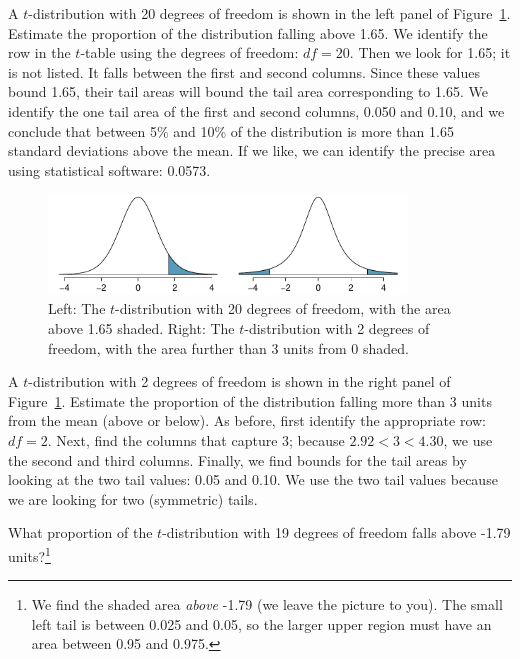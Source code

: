 \begin{example}{A $t$-distribution with 20 degrees of freedom is shown in the left panel of Figure~\ref{tDistDF20RightTail1Point65}. Estimate the proportion of the distribution falling above 1.65.}
We identify the row in the $t$-table using the degrees of freedom: $df=20$. Then we look for 1.65; it is not listed. It falls between the first and second columns. Since these values bound 1.65, their tail areas will bound the tail area corresponding to 1.65. We identify the one tail area of the first and second columns, 0.050 and 0.10, and we conclude that between 5\% and 10\% of the distribution is more than 1.65 standard deviations above the mean. If we like, we can identify the precise area using statistical software: 0.0573.
\end{example}

\begin{figure}
\centering
\includegraphics[width=0.85\textwidth]{ch_inference_for_means/figures/tDistDF20RightTail1Point65/tDistDF20RightTail1Point65}
\caption{Left: The $t$-distribution with 20 degrees of freedom, with the area above 1.65 shaded. Right: The $t$-distribution with 2 degrees of freedom, with the area further than 3 units from 0 shaded.}
\label{tDistDF20RightTail1Point65}
\end{figure}

\begin{example}{A $t$-distribution with 2 degrees of freedom is shown in the right panel of Figure~\ref{tDistDF20RightTail1Point65}. Estimate the proportion of the distribution falling more than 3 units from the mean (above or below).}
As before, first identify the appropriate row: $df=2$. Next, find the columns that capture 3; because $2.92 < 3 < 4.30$, we use the second and third columns. Finally, we find bounds for the tail areas by looking at the two tail values: 0.05 and 0.10. We use the two tail values because we are looking for two (symmetric) tails.
\end{example}

\begin{exercise}
What proportion of the $t$-distribution with 19 degrees of freedom falls above -1.79 units?\footnote{We find the shaded area \emph{above} -1.79 (we leave the picture to you). The small left tail is between 0.025 and 0.05, so the larger upper region must have an area between 0.95 and 0.975.}


\end{exercise}



